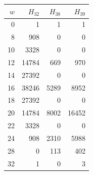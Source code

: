 \begin{tabular}{rrrr}
\toprule
$w$ & $H_{32}$ & $H_{38}$ & $H_{39}$\\
\midrule
0 & 1 & 1 & 1\\
8 & 908 & 0 & 0\\
10 & 3328 & 0 & 0\\
12 & 14784 & 669 & 970\\
14 & 27392 & 0 & 0\\
16 & 38246 & 5289 & 8952\\
18 & 27392 & 0 & 0\\
20 & 14784 & 8002 & 16452\\
22 & 3328 & 0 & 0\\
24 & 908 & 2310 & 5988\\
28 & 0 & 113 & 402\\
32 & 1 & 0 & 3\\
\bottomrule
\end{tabular}
